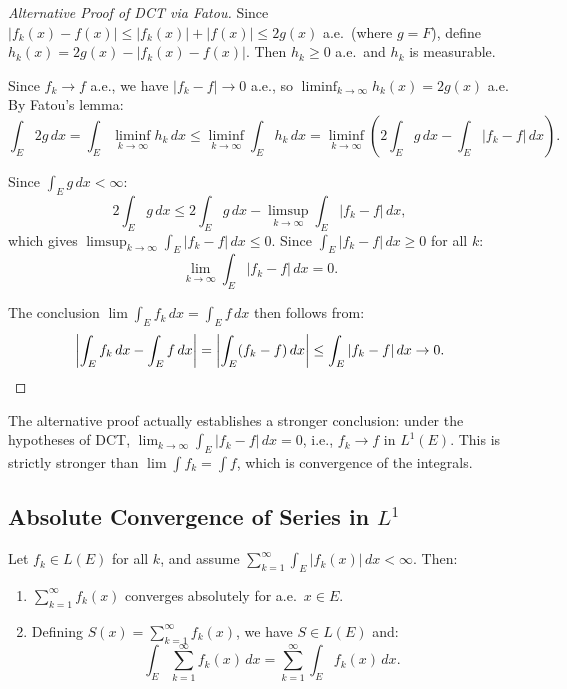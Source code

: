 \documentclass[11pt]{report}
\begin{document}
\begin{proof}[Alternative Proof of DCT via Fatou]
Since $|f_k(x) - f(x)| \leq |f_k(x)| + |f(x)| \leq 2g(x)$ a.e.\ (where $g = F$), define $h_k(x) = 2g(x) - |f_k(x) - f(x)|$. Then $h_k \geq 0$ a.e.\ and $h_k$ is measurable.

Since $f_k \to f$ a.e., we have $|f_k - f| \to 0$ a.e., so $\liminf_{k \to \infty} h_k(x) = 2g(x)$ a.e. By Fatou's lemma:
\[
\int_E 2g\,dx = \int_E \liminf_{k \to \infty} h_k\,dx \leq \liminf_{k \to \infty} \int_E h_k\,dx = \liminf_{k \to \infty} \left(2\int_E g\,dx - \int_E |f_k - f|\,dx\right).
\]

Since $\int_E g\,dx < \infty$:
\[
2\int_E g\,dx \leq 2\int_E g\,dx - \limsup_{k \to \infty} \int_E |f_k - f|\,dx,
\]
which gives $\limsup_{k \to \infty} \int_E |f_k - f|\,dx \leq 0$. Since $\int_E |f_k - f|\,dx \geq 0$ for all $k$:
\[
\lim_{k \to \infty} \int_E |f_k - f|\,dx = 0.
\]

The conclusion $\lim \int_E f_k\,dx = \int_E f\,dx$ then follows from:
\[
\left|\int_E f_k\,dx - \int_E f\,dx\right| = \left|\int_E (f_k - f)\,dx\right| \leq \int_E |f_k - f|\,dx \to 0. \qedhere
\]
\end{proof}

\begin{rembox}[$L^1$ Convergence]
The alternative proof actually establishes a stronger conclusion: under the hypotheses of DCT, $\lim_{k \to \infty} \int_E |f_k - f|\,dx = 0$, i.e., $f_k \to f$ in $L^1(E)$. This is strictly stronger than $\lim \int f_k = \int f$, which is convergence of the integrals.
\end{rembox}

\subsection{Absolute Convergence of Series in $L^1$}

\begin{corbox}
Let $f_k \in L(E)$ for all $k$, and assume $\sum_{k=1}^{\infty} \int_E |f_k(x)|\,dx < \infty$. Then:
\begin{enumerate}[label=(\roman*)]
\item $\sum_{k=1}^{\infty} f_k(x)$ converges absolutely for a.e.\ $x \in E$.
\item Defining $S(x) = \sum_{k=1}^{\infty} f_k(x)$, we have $S \in L(E)$ and:
\[
\int_E \sum_{k=1}^{\infty} f_k(x)\,dx = \sum_{k=1}^{\infty} \int_E f_k(x)\,dx.
\]
\end{enumerate}
\end{corbox}
\end{document}

